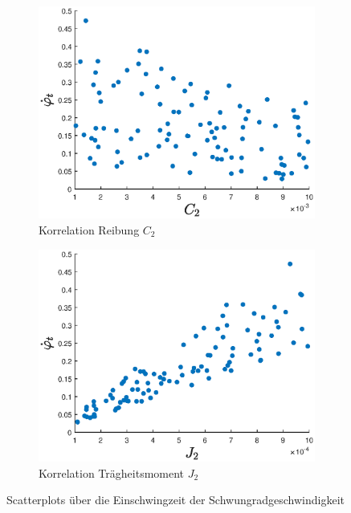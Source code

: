 \begin{figure}
    \centering
    \begin{subfigure}[]{0.45\textwidth}
        \centering
        \includegraphics[width=\textwidth]{Bilder/5_sensi/cm/dot_phi_t_c2.eps}
        \caption{Korrelation Reibung $C_2$}
        \label{fig:scatter_dotphi_t_c2}
    \end{subfigure}
   \begin{subfigure}[]{0.45\textwidth}
        \centering
        \includegraphics[width=\textwidth]{Bilder/5_sensi/cm/dot_phi_t_j2.eps}
        \caption{Korrelation Trägheitsmoment $J_2$}
        \label{fig:scatter_dotphi_t_j2}
    \end{subfigure}
    \caption{Scatterplots über die Einschwingzeit der Schwungradgeschwindigkeit}
\end{figure}

